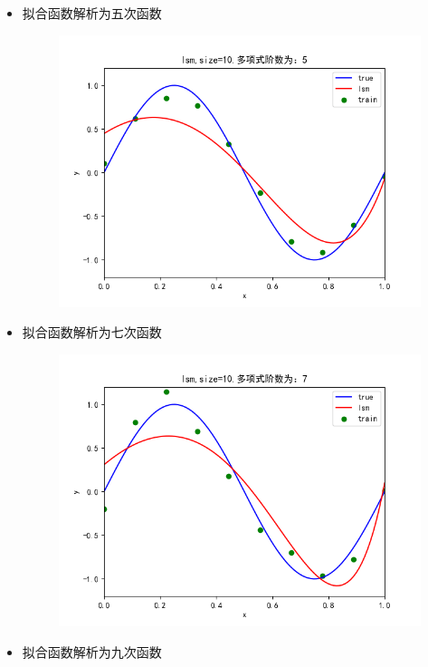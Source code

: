 \documentclass[lang=cn,a4paper,cite=authoryear]{elegantpaper}
\begin{document}
\begin{itemize}
\begin{figure}[H]
	\end{figure}
	\item 拟合函数解析为五次函数
	\begin{figure}[H]
		\centering
		\includegraphics[scale=0.5]{g5}
	\end{figure}
	\item 拟合函数解析为七次函数
	\begin{figure}[H]
		\centering
		\includegraphics[scale=0.5]{g7}
	\end{figure}
	\item 拟合函数解析为九次函数
	\begin{figure}[H]
		\centering

\end{figure}
\end{itemize}
\end{document}
